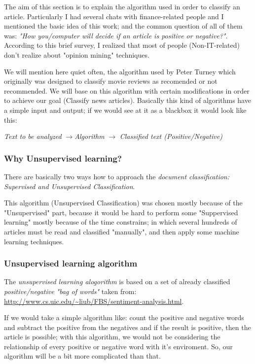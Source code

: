 The aim of this section is to explain the algorithm used in order to classify an article. Particularly I had several chats with finance-related people and I mentioned the basic idea of this work; and the common question of all of them was: \emph{"How you/computer will decide if an article is positive or negative?"}. According to this brief survey, I realized that most of people (Non-IT-related) don't realize about "opinion mining" techniques.

We will mention here quiet often, the algorithm used by Peter Turney \cite{T2002} which originally was designed to classify movie reviews as recomended or not recommended. We will base on this algorithm with certain modifications in order to achieve our goal (Classify news articles). Basically this kind of algorithms have a simple input and output; if we would see at it as a blackbox it would look like this:


\emph{Text to be analyzed} $\rightarrow $\emph{Algorithm} $\rightarrow$ \emph{Classified text (Positive/Negative)}

\subsubsection{Why Unsupervised learning?}\label{whyUnsupervised}

There are basically two ways how to approach the \emph{document classification: Supervised and Unsupervised Classification}.

This algorithm (Unsupervised Classification) was chosen mostly because of the "Unsupervised" part, because it would be hard to perform some "Suppervised learning" mostly because of the time constrains; in which several hundreds of articles must be read and classified "manually", and then apply some machine learning techniques.

\subsubsection{Unsupervised learning algorithm}\label{unsupervisedAlgoritm}

The \emph{unsupervised learning alogorithm} is based on a set of already classified \emph{positive/negative "bag of words"} taken from: \url{http://www.cs.uic.edu/~liub/FBS/sentiment-analysis.html}.

If we would take a simple algorithm like: count the positive and negative words and subtract the positive from the negatives and if the result is positive, then the article is possible; with this algorithm, we would not be considering the relationship of every positive or negative word with it's enviroment. So, our algorithm will be a bit more complicated than that. 

